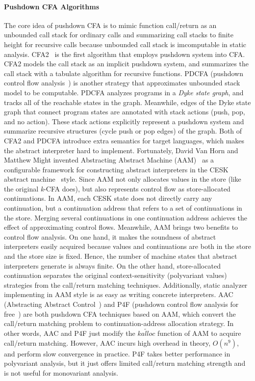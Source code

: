 \documentclass{article}
\begin{document}
\paragraph{Pushdown CFA Algorithms}
The core idea of pushdown CFA is to mimic function call/return as an unbounded call stack for ordinary calls and summarizing call stacks to finite height for recursive calls because unbounded call stack is imcomputable in static analysis.
CFA2~\cite{vardoulakis2010cfa2} is the first algorithm that employs pushdown system into CFA\@.
CFA2 models the call stack as an implicit pushdown system, and summarizes the call stack with a tabulate algorithm for recursive functions.
PDCFA (pushdown control flow analysis~\cite{earl2010pushdown})
is another strategy that approximates unbounded stack model to be computable.
PDCFA analyzes programs in a \emph{Dyke state graph}, and tracks all of the reachable states in the graph.
Meanwhile, edges of the Dyke state graph that connect program states are annotated with stack actions (push, pop, and no action).
These stack actions explicitly represent a pushdown system and summarize recursive structures (cycle push or pop edges) of the graph.
Both of CFA2 and PDCFA introduce extra semantics for target languages, which makes the abstract interpreter hard to implement.
Fortunately, David Van Horn and Matthew Might
invented Abstracting Abstract Machine (AAM)~\cite{van2010abstracting}
as a configurable framework for constructing abstract interpreters in the CESK abstract machine~\cite{felleisen1987calculus} style.
Since AAM not only allocates values in the store (like the original \textit{k}-CFA does), but also represents control flow as store-allocated continuations.
In AAM, each CESK state does not directly carry any continuation, but a continuation address that refers to a set of continuations in the store.
Merging several continuations in one continuation address achieves the effect of approximating control flows.
Meanwhile, AAM brings two benefits to control flow analysis.
On one hand, it makes the soundness of abstract interpreters easily acquired because values and continuations are both in the store and
the store size is fixed.
Hence, the number of machine states that abstract interpreters generate is always finite.
On the other hand, store-allocated continuation separates the original context-sensitivity (polyvariant values) strategies from
the call/return matching techniques.
Additionally, static analyzer implementing in AAM style is as easy as writing concrete interpreters.
AAC (Abstracting Abstract Control~\cite{johnson2015abstracting}) and P4F (pushdown control flow analysis for free~\cite{gilray2016pushdown})
are both pushdown CFA techniques based on AAM\@, which convert the call/return matching problem to continuation-address allocation strategy.
In other words, AAC and P4F just modify the $\widetilde{kalloc}$ function of AAM to acquire call/return matching.
However, AAC incurs high overhead in theory, $O(n^9)$, and perform slow convergence in practice. %
P4F takes better performance in polyvariant analysis, but it just offers limited call/return matching strength and is not useful for monovariant analysis.
\end{document}
